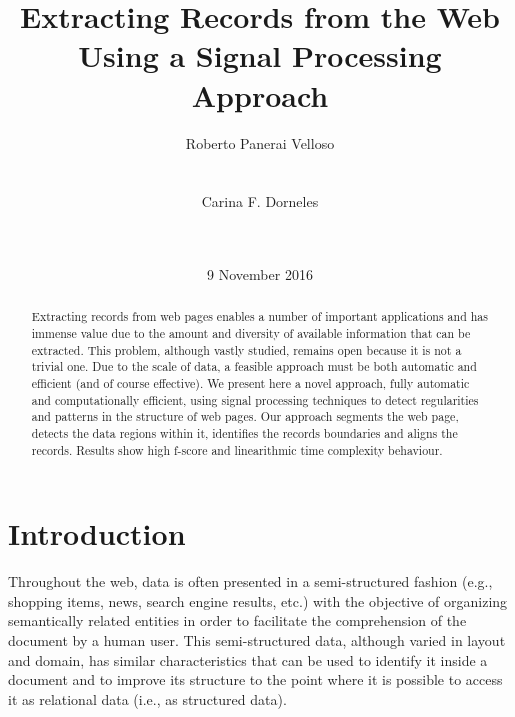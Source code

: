 \documentclass{vldb}
\title{Extracting Records from the Web Using a Signal Processing Approach}
\author{
\alignauthor
Roberto Panerai Velloso\\
       \affaddr{Universidade Federal de Santa Catarina}\\
       \affaddr{Florianópolis (SC), Brazil}\\
       \email{rvelloso@gmail.com}
\alignauthor
Carina F. Dorneles\\
       \affaddr{Universidade Federal de Santa Catarina}\\
       \affaddr{Florianópolis (SC), Brazil}\\
       \email{dorneles@inf.ufsc.br}
}
\date{9 November 2016}
\begin{document}

\maketitle

\begin{abstract}
Extracting records from web pages enables a number of important
applications and has immense value due to the amount and diversity of
available information that can be extracted. This problem, although vastly
studied, remains open because it is not a trivial one. Due to the scale of data,
a feasible approach must be both automatic and efficient (and of course
effective). We present here a novel approach, fully automatic and
computationally efficient, using signal processing techniques to detect
regularities and patterns in the structure of web pages. Our approach segments
the web page, detects the data regions within it, identifies the records
boundaries and aligns the records. Results show high f-score and
linearithmic time complexity behaviour.
\end{abstract}

\section{Introduction}

Throughout the web, data is often presented in a semi-structured fashion (e.g.,
shopping items, news, search engine results, etc.) with the objective of
organizing semantically related entities in order to facilitate the
comprehension of the document by a human user. This semi-structured data,
although varied in layout and domain, has similar characteristics that can be
used to identify it inside a document and to improve its structure to the point
where it is possible to access it as relational data (i.e., as structured data).
\end{document}
